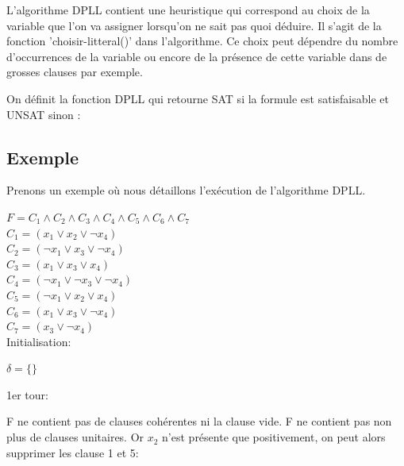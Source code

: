 \documentclass[12pt]{extarticle}
\begin{document}
L'algorithme DPLL contient une heuristique qui correspond au choix de la variable que l'on va assigner lorsqu'on ne sait pas quoi déduire. Il s'agit de la fonction 'choisir-litteral()' dans l'algorithme. Ce choix peut dépendre du nombre d'occurrences de la variable ou encore de la présence de cette variable dans de grosses clauses par exemple.

On définit la fonction DPLL qui retourne SAT si la formule est satisfaisable et UNSAT sinon :

\vspace{2em}

\begin{algorithm}[H]
\end{algorithm}

\subsection{Exemple}

Prenons un exemple où nous détaillons l'exécution de l'algorithme DPLL.

$F = C_1 \land C_2 \land C_3 \land C_4 \land C_5 \land C_6 \land C_7$ \\
$C_1 = (x_1 \lor x_2 \lor \lnot{x_4})$ \\
$C_2 = (\lnot{x_1} \lor x_3 \lor \lnot{x_4})$ \\
$C_3 = (x_1 \lor x_3 \lor x_4)$ \\
$C_4 = (\lnot{x_1} \lor \lnot{x_3} \lor \lnot{x_4})$ \\
$C_5 = (\lnot{x_1} \lor x_2 \lor x_4)$ \\
$C_6 = (x_1 \lor x_3 \lor \lnot{x_4})$ \\
$C_7 = (x_3 \lor \lnot{x_4})$ \\

Initialisation:

$\delta = \{\}$

1er tour:

F ne contient pas de clauses cohérentes ni la clause vide. F ne contient pas non plus de clauses unitaires. Or $x_2$ n'est présente que positivement, on peut alors supprimer les clause 1 et 5:
\end{document}
